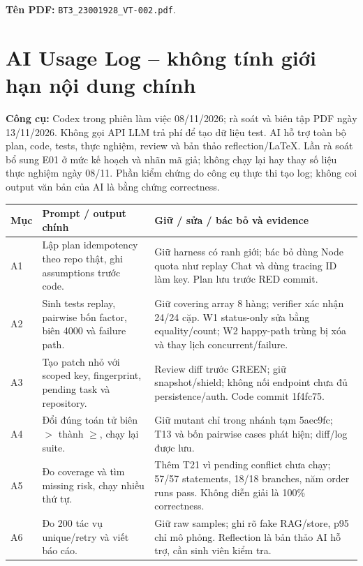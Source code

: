 \documentclass[11pt,a4paper]{article}
\begin{document}
\textbf{Tên PDF:} \mbox{\texttt{BT3\_23001928\_VT-002.pdf}}.

\clearpage
\appendix
{}
\section{AI Usage Log -- không tính giới hạn nội dung chính}
\textbf{Công cụ:} Codex trong phiên làm việc 08/11/2026; rà soát và biên tập PDF ngày 13/11/2026. Không gọi API LLM trả phí để tạo dữ liệu test. AI hỗ trợ toàn bộ plan, code, tests, thực nghiệm, review và bản thảo reflection/LaTeX. Lần rà soát bổ sung E01 ở mức kế hoạch và nhãn mã giả; không chạy lại hay thay số liệu thực nghiệm ngày 08/11. Phần kiểm chứng do công cụ thực thi tạo log; không coi output văn bản của AI là bằng chứng correctness.

\begin{tabular}{@{}L{11mm}L{62mm}L{\dimexpr\textwidth-73mm-4\tabcolsep\relax}@{}}
\toprule
\textbf{Mục} & \textbf{Prompt / output chính} & \textbf{Giữ / sửa / bác bỏ và evidence}\\\midrule
A1 & Lập plan idempotency theo repo thật, ghi assumptions trước code. & Giữ harness có ranh giới; bác bỏ dùng Node quota như replay Chat và dùng tracing ID làm key. Plan lưu trước RED commit.\\[4pt]
A2 & Sinh tests replay, pairwise bốn factor, biên 4000 và failure path. & Giữ covering array 8 hàng; verifier xác nhận 24/24 cặp. W1 status-only sửa bằng equality/count; W2 happy-path trùng bị xóa và thay lịch concurrent/failure.\\[4pt]
A3 & Tạo patch nhỏ với scoped key, fingerprint, pending task và repository. & Review diff trước GREEN; giữ snapshot/shield; không nối endpoint chưa đủ persistence/auth. Code commit 1f4fc75.\\[4pt]
A4 & Đổi đúng toán tử biên \(>\) thành \(\geq\), chạy lại suite. & Giữ mutant chỉ trong nhánh tạm 5aec9fc; T13 và bốn pairwise cases phát hiện; diff/log được lưu.\\[4pt]
A5 & Đo coverage và tìm missing risk, chạy nhiều thứ tự. & Thêm T21 vì pending conflict chưa chạy; 57/57 statements, 18/18 branches, năm order runs pass. Không diễn giải là 100\% correctness.\\[4pt]
A6 & Đo 200 tác vụ unique/retry và viết báo cáo. & Giữ raw samples; ghi rõ fake RAG/store, p95 chỉ mô phỏng. Reflection là bản thảo AI hỗ trợ, cần sinh viên kiểm tra.\\
\bottomrule
\end{tabular}
\end{document}

